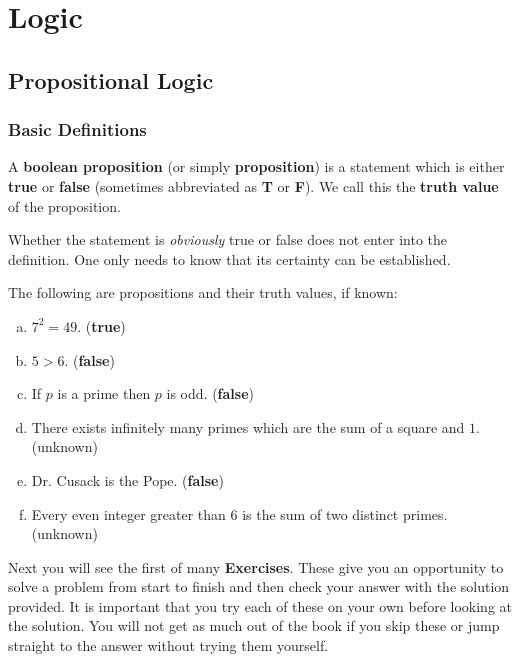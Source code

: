 \chapter{Logic}\label{chapter:logicEtc}

\section{Propositional Logic}\label{section:logic}
\subsection{Basic Definitions}\label{section:logicDefs}
\begin{df}
A {\bf boolean proposition} (or simply {\bf proposition}) is a statement which is either 
{\bf true} or {\bf false} (sometimes abbreviated as {\bf T} or {\bf F}).
We call this the {\bf truth value} of the proposition.
\end{df}
Whether the statement is {\em obviously} true or false does not
enter into the definition. One only needs to know that its certainty
can be established.
\begin{exa}
The following are propositions and their truth values, if known:
\begin{enumerate}[(a)]
\item $7^2 = 49$. ({\bf true}) \item $5>6$. ({\bf false})  
\item If $p$
is a prime then $p$ is odd. ({\bf false}) 
\item There exists infinitely
many primes which are the sum of a square and $1$. (unknown)
\item Dr. Cusack is the Pope. ({\bf false}) 
\item Every
even integer greater than $6$ is the sum of two distinct primes.
(unknown)
\end{enumerate}
\end{exa}


\begin{rem}
Next you will see the first of many {\bf Exercises}.
These give you an opportunity to solve a problem from start to finish 
and then check your answer with the solution provided.
It is important that you try each of these on your own before looking at the solution.
You will not get as much out of the book if you skip these or jump straight to the answer
without trying them yourself.
\end{rem}

